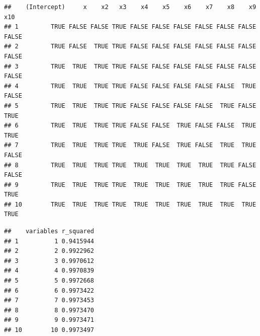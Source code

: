 \documentclass[]{article}
\newenvironment{Shaded}{\begin{snugshade}}{\end{snugshade}}
\newcommand{\KeywordTok}[1]{\textcolor[rgb]{0.13,0.29,0.53}{\textbf{#1}}}
\newcommand{\DataTypeTok}[1]{\textcolor[rgb]{0.13,0.29,0.53}{#1}}
\newcommand{\DecValTok}[1]{\textcolor[rgb]{0.00,0.00,0.81}{#1}}
\newcommand{\CommentTok}[1]{\textcolor[rgb]{0.56,0.35,0.01}{\textit{#1}}}
\newcommand{\OperatorTok}[1]{\textcolor[rgb]{0.81,0.36,0.00}{\textbf{#1}}}
\newcommand{\NormalTok}[1]{#1}
\begin{document}
\begin{verbatim}
##    (Intercept)     x    x2   x3    x4    x5    x6    x7    x8    x9   x10
## 1         TRUE FALSE FALSE TRUE FALSE FALSE FALSE FALSE FALSE FALSE FALSE
## 2         TRUE FALSE  TRUE TRUE FALSE FALSE FALSE FALSE FALSE FALSE FALSE
## 3         TRUE  TRUE  TRUE TRUE FALSE FALSE FALSE FALSE FALSE FALSE FALSE
## 4         TRUE  TRUE  TRUE TRUE FALSE FALSE FALSE FALSE FALSE  TRUE FALSE
## 5         TRUE  TRUE  TRUE TRUE FALSE FALSE FALSE FALSE  TRUE FALSE  TRUE
## 6         TRUE  TRUE  TRUE TRUE FALSE FALSE  TRUE FALSE FALSE  TRUE  TRUE
## 7         TRUE  TRUE  TRUE TRUE  TRUE FALSE  TRUE FALSE  TRUE  TRUE FALSE
## 8         TRUE  TRUE  TRUE TRUE  TRUE  TRUE  TRUE  TRUE  TRUE FALSE FALSE
## 9         TRUE  TRUE  TRUE TRUE  TRUE  TRUE  TRUE  TRUE  TRUE FALSE  TRUE
## 10        TRUE  TRUE  TRUE TRUE  TRUE  TRUE  TRUE  TRUE  TRUE  TRUE  TRUE
\end{verbatim}

\begin{Shaded}
\end{Shaded}

\begin{verbatim}
##    variables r_squared
## 1          1 0.9415944
## 2          2 0.9922962
## 3          3 0.9970612
## 4          4 0.9970839
## 5          5 0.9972668
## 6          6 0.9973422
## 7          7 0.9973453
## 8          8 0.9973470
## 9          9 0.9973471
## 10        10 0.9973497
\end{verbatim}

\begin{Shaded}
\end{Shaded}
\end{document}
